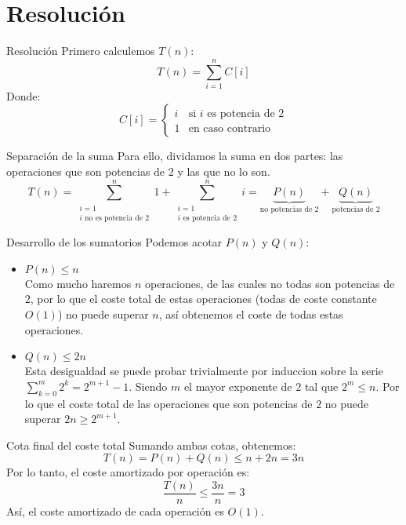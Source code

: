 \documentclass[aspectratio=169]{beamer}
\begin{document}
\section{Resolución}

\begin{frame}{Resolución}
    Primero calculemos $T(n)$:
    \[
    T(n) = \sum_{i=1}^{n} C[i]
    \]
    Donde:
    \[
    C[i] = 
    \begin{cases}
        i & \text{si } i \text{ es potencia de } 2 \\
        1 & \text{en caso contrario}
    \end{cases}
    \]
\end{frame}

\begin{frame}{Separación de la suma}
    Para ello, dividamos la suma en dos partes: las operaciones que son potencias de $2$ y las que no lo son.
    \[
    T(n) = \sum_{\substack{i=1 \\ i \text{ no es potencia de } 2}}^{n} 1 + \sum_{\substack{i=1 \\ i \text{ es potencia de } 2}}^{n} i = \underbrace{P(n)}_{\text{no potencias de } 2} + \underbrace{Q(n)}_{\text{potencias de } 2}
    \]
\end{frame}

\begin{frame}{Desarrollo de los sumatorios}
    Podemos acotar $P(n)$ y $Q(n)$:
    \begin{itemize}
        \item $P(n) \leq n$ \\
        Como mucho haremos $n$ operaciones, de las cuales no todas son potencias de $2$, por lo que el coste total de estas operaciones (todas de coste constante $O(1)$) no puede superar $n$, así obtenemos el coste de todas estas operaciones.
        \item $Q(n) \leq 2n$ \\
        Esta desigualdad se puede probar trivialmente por induccion sobre la serie $\sum_{k=0}^{m} 2^k = 2^{m+1} - 1$. Siendo $m$ el mayor exponente de $2$ tal que $2^m \leq n$. Por lo que el coste total de las operaciones que son potencias de $2$ no puede superar $2n \geq 2^{m+1}$. 
    \end{itemize}
\end{frame}

\begin{frame}{Cota final del coste total}
    Sumando ambas cotas, obtenemos:
    \[
    T(n) = P(n) + Q(n) \leq n + 2n = 3n
    \]
    Por lo tanto, el coste amortizado por operación es:
    \[
    \frac{T(n)}{n} \leq \frac{3n}{n} = 3
    \]
    Así, el coste amortizado de cada operación es $O(1)$.
\end{frame}
\end{document}
